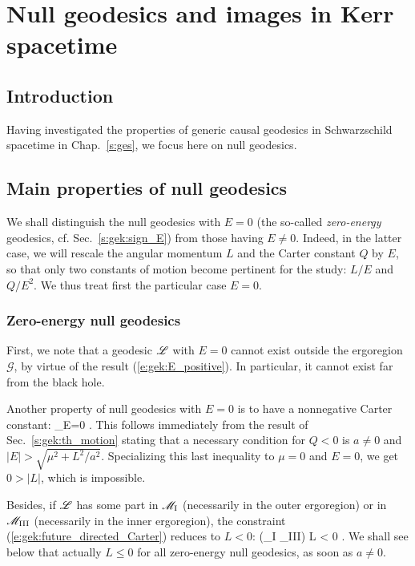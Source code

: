 \chapter{Null geodesics and images in Kerr spacetime}
\label{s:gik}

\minitoc

\section{Introduction}

Having investigated the properties of generic causal geodesics
in Schwarzschild spacetime in Chap.~\ref{s:ges}, we focus here on null
geodesics.


\section{Main properties of null geodesics} \label{s:gik:properties}

We shall distinguish the null geodesics with $E=0$ (the so-called \emph{zero-energy} geodesics,
cf. Sec.~\ref{s:gek:sign_E})
 from those having
$E \neq 0$. Indeed, in the latter case, we will rescale the angular momentum
$L$ and the Carter constant $Q$ by $E$, so that only two constants of motion become
pertinent for the study: $L/E$ and $Q/E^2$.
We thus treat first the particular case $E=0$.

\subsection{Zero-energy null geodesics} \label{s:gik:zero_energy}

First, we note that a geodesic $\mathscr{L}$ with $E=0$ cannot exist outside the ergoregion
$\mathscr{G}$, by virtue of the result (\ref{e:gek:E_positive}). In particular,
it cannot exist far from the black hole.

Another property of null geodesics with $E=0$ is to have a nonnegative Carter constant:
\be \label{e:gik:Q_nonneg_E_zero}
   _{E=0} .
\ee
This follows immediately from the result of Sec.~\ref{s:gek:th_motion}
stating that a necessary condition for $Q < 0$ is $a\neq 0$ and
$|E| > \sqrt{\mu^2 + L^2/a^2}$. Specializing this last inequality to $\mu=0$
and $E=0$, we get $0 > |L|$, which is impossible.

Besides, if $\mathscr{L}$ has some part in $\mathscr{M}_{\rm I}$ (necessarily in the outer ergoregion)
or in $\mathscr{M}_{\rm III}$ (necessarily in the inner ergoregion),
the constraint (\ref{e:gek:future_directed_Carter})
reduces to $L<0$:
\be \label{e:gik:E_zero_L_neg_ergo}
    \Li \cap (\M_{\rm I} \cup \M_{\rm III}) \neq  \varnothing \quad \Longrightarrow \quad L < 0 .
\ee
We shall see below that actually $L \leq 0$ for all zero-energy null geodesics, as soon as $a\neq 0$.

